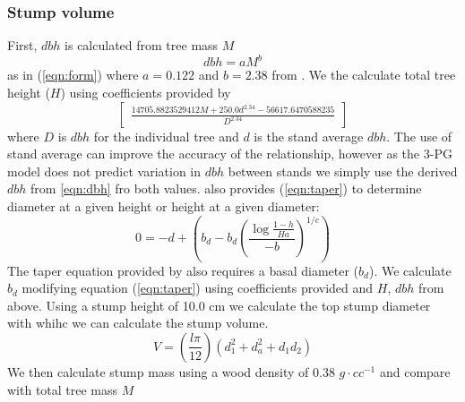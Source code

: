 \subsubsection*{Stump volume}
\label{sec:allo}
First, $dbh$ is calculated from tree mass $M$
\begin{equation}
    \label{eqn:dbh}
    dbh=aM^b
    \end{equation}as in (\ref{eqn:form}) where $a=0.122$ and $b=2.38$ from \cite{Landsberg1997}.
We the calculate total tree height ($H$) using coefficients provided by \cite{Brahim2000}
\begin{equation}
    \label{eqn:height}
    \begin{bmatrix}\frac{14705.8823529412 M + 250.0 d^{2.34} -56617.6470588235}{D^{2.34}}\end{bmatrix}
    \end{equation}where $D$ is $dbh$ for the individual tree and $d$ is the stand average $dbh$. The use of stand average can improve the accuracy of the relationship, however as the 3-PG model does not predict variation in $dbh$ between stands we simply use the derived $dbh$ from \ref{eqn:dbh} fro both values. \cite{Benbrahim2003} also provides (\ref{eqn:taper}) to determine diameter at a given height or height at a given diameter:
\begin{equation}
    \label{eqn:taper}
    0=-d+\left(b_d-b_d\left(\frac{\log{\frac{1-h}{Ha}}}{-b}\right)^{1/c}\right)
    \end{equation}The taper equation provided by \cite{Benbrahim2003} also requires a basal diameter ($b_d$). We calculate $b_d$ modifying equation (\ref{eqn:taper}) using coefficients provided and $H$, $dbh$ from above. Using a stump height of 10.0 cm we calculate the top stump diameter with whihc we can calculate the stump volume.
\begin{equation}
    \label{eqn:sectionvolume}
    V=\left(\frac{l\pi}{12}\right)(d_1^2+d_a^2+d_1d_2)
    \end{equation}We then calculate stump mass using a wood density of 0.38 $g \cdot cc^{-1}$ and compare with total tree mass $M$
